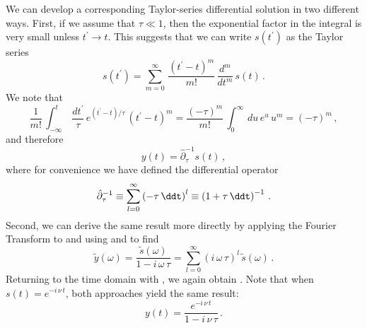 We can develop a corresponding Taylor-series differential solution in two different ways. First, if we assume that $\tau \ll 1$, then the exponential factor in the integral is very small unless $t^\prime \rightarrow t$. This suggests that we can write $s\left(t^\prime\right)$ as the Taylor series
 \begin{equation}
   s\left(t^\prime\right) = \sum_{m = 0}^\infty\, \frac{\left(t^\prime - t\right)^m}{m!}\, \frac{d^m}{d t^m}\, s(t)\, .
 \end{equation}
 We note that
\begin{equation}
  \frac{1}{m!}\,  \int_{-\infty}^t\, \frac{d t^\prime}{\tau}\, e^{(t^\prime - t)/\tau}\, \left(t^\prime - t\right)^m = \frac{\left(-\tau\right)^m}{m!}\, \int_0^\infty\, du\, e^{u}\, u^m = \left(-\tau\right)^m\, ,
\end{equation}
 and therefore
 \begin{equation} \label{eqn:fodes_driven_example_soln_diff}
  y(t) = \hat{\partial}_\tau^{-1}  s(t)\, ,
\end{equation}
where for convenience we have defined the differential operator
\begin{equation} %
  \hat{\partial}_\tau^{-1}  \equiv \sum_{l = 0}^{\infty} \left( -\tau\, \ddt \right)^l \equiv \left(1 + \tau\, \ddt\right)^{-1}\, .
 \end{equation}
Second, we can derive the same result more directly by applying the Fourier Transform to  and using  and  to find
\begin{equation}
  \widetilde{y}(\omega) = \frac{\widetilde{s}(\omega)}{1 - i\, \omega\, \tau} = \sum_{l = 0}^{\infty} (i\, \omega\, \tau)^l\, \widetilde{s}(\omega)\, .
\end{equation}
Returning to the time domain with , we again obtain . Note that when $s(t) = e^{-i\, \nu\, t}$, both approaches yield the same result:
\begin{equation}
    y(t) = \frac{e^{-i\, \nu\, t}}{1 - i\, \nu\, \tau}\, .
\end{equation}

